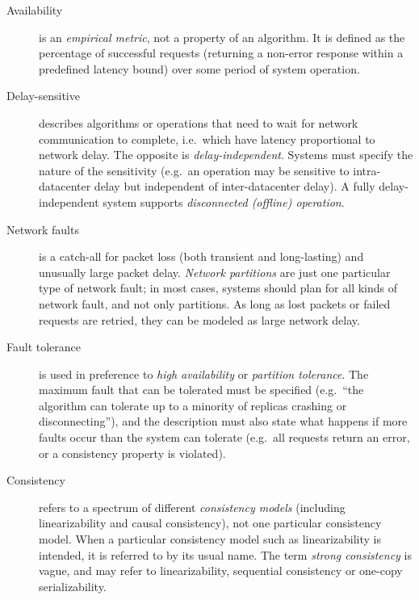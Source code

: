 \documentclass[a4paper,twocolumn,10pt]{article}
\begin{document}
\begin{description}
\item[Availability] is an \emph{empirical metric}, not a property of an algorithm. It is defined as
    the percentage of successful requests (returning a non-error response within a predefined
    latency bound) over some period of system operation.
\item[Delay-sensitive] describes algorithms or operations that need to wait for network
    communication to complete, i.e.\ which have latency proportional to network delay. The opposite
    is \emph{delay-independent}. Systems must specify the nature of the sensitivity (e.g.\ an
    operation may be sensitive to intra-datacenter delay but independent of inter-datacenter delay).
    A fully delay-independent system supports \emph{disconnected (offline) operation}.
\item[Network faults] is a catch-all for packet loss (both transient and long-lasting) and unusually
    large packet delay. \emph{Network partitions} are just one particular type of network fault; in
    most cases, systems should plan for all kinds of network fault, and not only partitions. As
    long as lost packets or failed requests are retried, they can be modeled as large network delay.
\item[Fault tolerance] is used in preference to \emph{high availability} or \emph{partition
    tolerance}. The maximum fault that can be tolerated must be specified (e.g.\ ``the algorithm can
    tolerate up to a minority of replicas crashing or disconnecting''), and the description must
    also state what happens if more faults occur than the system can tolerate (e.g.\ all requests
    return an error, or a consistency property is violated).
\item[Consistency] refers to a spectrum of different \emph{consistency models} (including
    linearizability and causal consistency), not one particular consistency model. When a particular
    consistency model such as linearizability is intended, it is referred to by its usual name. The
    term \emph{strong consistency} is vague, and may refer to linearizability, sequential
    consistency or one-copy serializability.
\end{description}

\end{document}
